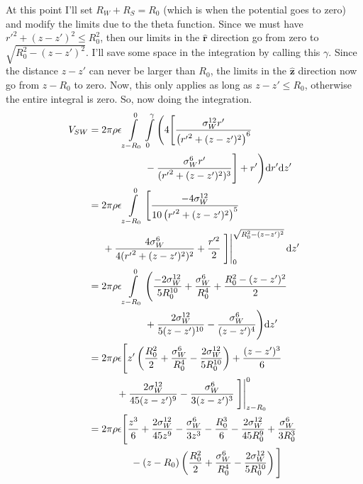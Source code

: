 \documentclass[letterpaper,twocolumn,amsmath,amssymb,prb]{revtex4-1}
\begin{document}
At this point I'll set $R_W + R_S = R_0$ (which is when the potential
goes to zero) and modify the limits due to the theta function. Since
we must have ${r'}^2 + (z-z')^2 \leq R_0^2$, then our limits in the
$\mathbf{\hat{r}}$ direction go from zero to $\sqrt{R_0^2 -
  (z-z')^2}$. I'll save some space in the integration by calling this
$\gamma$.  Since the distance $z-z'$ can never be larger than $R_0$,
the limits in the $\mathbf{\hat{z}}$ direction now go from $z-R_0$ to
zero. Now, this only applies as long as $z-z' \leq R_0$, otherwise the
entire integral is zero. So, now doing the integration.
\begin{align}
  V_{SW} &= 2\pi\rho\epsilon \int\limits_{z-R_0}^0
  \int\limits_{0}^{\gamma} \Bigg( 4 \Bigg[
    \frac{\sigma_W^{12}r'}{\left({r'}^2 + (z-z')^2\right)^6} \notag \\
    &\hspace{2cm}-\frac{\sigma_W^6r'}{({r'}^2 + (z-z')^2)^3} \Bigg]
  + r' \Bigg) \textrm{d}r' \textrm{d}z' \\
  &= 2\pi\rho\epsilon \int\limits_{z-R_0}^0
  \Bigg[\frac{-4\sigma_W^{12}}{10\left({r'}^2 + (z-z')^2\right)^5}
    \notag \\
    &\hspace{0.5cm}+\frac{4\sigma_W^6}{4({r'}^2 + (z-z')^2)^2}
  + \frac{r'^2}{2} \left.\Bigg]\right|_0^{\sqrt{R_0^2 - (z-z')^2}} \textrm{d}z' \\
  &= 2\pi\rho\epsilon \int\limits_{z-R_0}^0 \Bigg(
  \frac{-2\sigma_W^{12}}{5R_0^{10}} + \frac{\sigma_W^6}{R_0^4}
  +\frac{R_0^2 - (z-z')^2}{2} \notag \\
  &\hspace{2cm}+ \frac{2\sigma_W^{12}}{5(z-z')^{10}} - \frac{\sigma_W^6}{(z-z')^4}
  \Bigg) \textrm{d}z' \\
  &= 2\pi\rho\epsilon \Bigg[ z'\left(\frac{R_0^2}{2} +
    \frac{\sigma_W^6}{R_0^4} - \frac{2\sigma_W^{12}}{5R_0^{10}}\right)
    + \frac{(z-z')^3}{6} \notag \\
    &\hspace{1cm}+ \frac{2\sigma_W^{12}}{45(z-z')^9} -
    \frac{\sigma_W^6}{3(z-z')^3}\left.\Bigg] \right|_{z-R_0}^0 \\
  &= 2\pi\rho\epsilon \Bigg[ \frac{z^3}{6} + \frac{2\sigma_W^{12}}{45z^9} -
    \frac{\sigma_W^6}{3z^3} - \frac{R_0^3}{6} - \frac{2\sigma_W^{12}}{45R_0^9} +
    \frac{\sigma_W^6}{3R_0^3} \notag \\
    & \hspace{1.5cm}- (z-R_0)\left(\frac{R_0^2}{2} +
    \frac{\sigma_W^6}{R_0^4} - \frac{2\sigma_W^{12}}{5R_0^{10}}\right) \Bigg]
\end{align}
\end{document}
